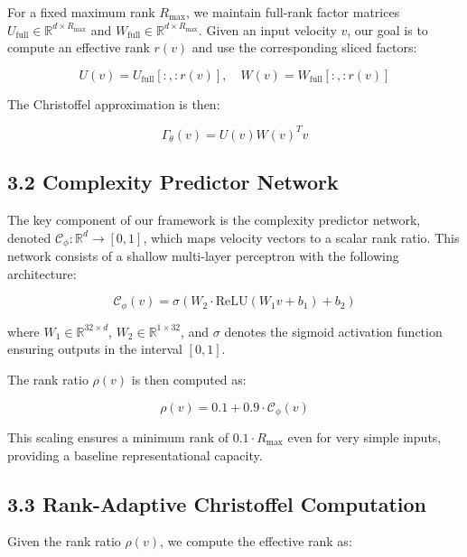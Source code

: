 \documentclass[12pt]{article}
\begin{document}
For a fixed maximum rank $R_{\max}$, we maintain full-rank factor matrices $U_{\text{full}} \in \mathbb{R}^{d \times R_{\max}}$ and $W_{\text{full}} \in \mathbb{R}^{d \times R_{\max}}$. Given an input velocity $v$, our goal is to compute an effective rank $r(v)$ and use the corresponding sliced factors:

\begin{equation}
U(v) = U_{\text{full}}[:, :r(v)], \quad W(v) = W_{\text{full}}[:, :r(v)]
\end{equation}

The Christoffel approximation is then:

\begin{equation}
\Gamma_\theta(v) = U(v) W(v)^T v
\end{equation}

\subsection{3.2 Complexity Predictor Network}

The key component of our framework is the complexity predictor network, denoted $\mathcal{C}_\phi: \mathbb{R}^d \to [0,1]$, which maps velocity vectors to a scalar rank ratio. This network consists of a shallow multi-layer perceptron with the following architecture:

\begin{equation}
\mathcal{C}_\phi(v) = \sigma(W_2 \cdot \text{ReLU}(W_1 v + b_1) + b_2)
\end{equation}

where $W_1 \in \mathbb{R}^{32 \times d}$, $W_2 \in \mathbb{R}^{1 \times 32}$, and $\sigma$ denotes the sigmoid activation function ensuring outputs in the interval $[0,1]$.

The rank ratio $\rho(v)$ is then computed as:

\begin{equation}
\rho(v) = 0.1 + 0.9 \cdot \mathcal{C}_\phi(v)
\end{equation}

This scaling ensures a minimum rank of $0.1 \cdot R_{\max}$ even for very simple inputs, providing a baseline representational capacity.

\subsection{3.3 Rank-Adaptive Christoffel Computation}

Given the rank ratio $\rho(v)$, we compute the effective rank as:
\end{document}
